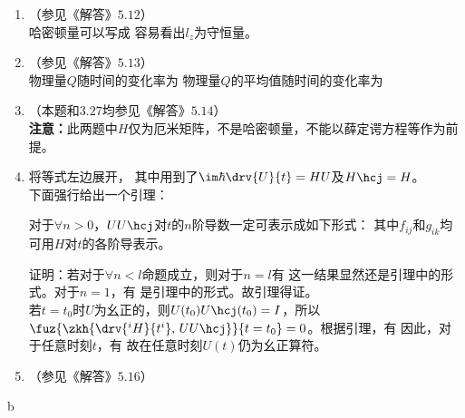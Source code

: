 \begin{enumerate}[label=\textbf{3.\arabic*}]
\item
（参见《解答》$5.12$）\\
哈密顿量可以写成
容易看出$l_z$为守恒量。

\item
（参见《解答》$5.13$）\\
物理量$Q$随时间的变化率为
物理量$Q$的平均值随时间的变化率为

\item
（本题和$3.27$均参见《解答》$5.14$）\\
\textbf{注意：}此两题中$H$仅为厄米矩阵，不是哈密顿量，不能以薛定谔方程等作为前提。

\item
将等式左边展开，
其中用到了$\im\hbar\drv{U}{t}=HU$及$H\hcj=H$。\\
下面强行给出一个引理：
\begin{lemma}
对于$\forall n>0$，$UU\hcj$对$t$的$n$阶导数一定可表示成如下形式：
其中$f_{ij}$和$g_{ik}$均可用$H$对$t$的各阶导表示。
\end{lemma}
证明：若对于$\forall n<l$命题成立，则对于$n=l$有
这一结果显然还是引理中的形式。对于$n=1$，有
是引理中的形式。故引理得证。\\
若$t=t_0$时$U$为幺正的，则$U(t_0)U\hcj(t_0)=I$，所以$\fuz{\zkh{\drv{^iH}{t^i},\,UU\hcj}}{t=t_0}=0$。根据引理，有
因此，对于任意时刻$t$，有
故在任意时刻$U(t)$仍为幺正算符。

\item
（参见《解答》$5.16$）

\end{enumerate}


b